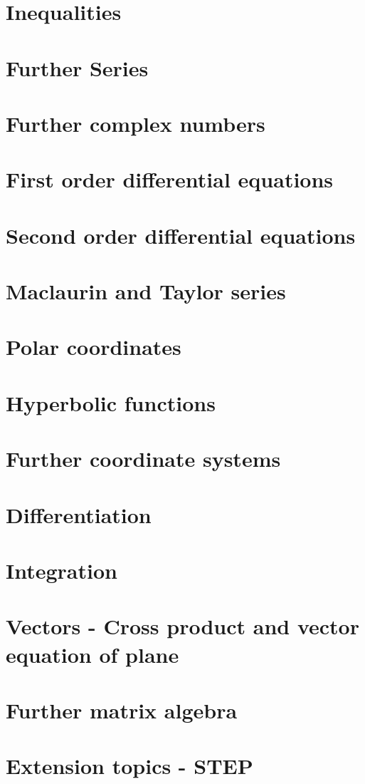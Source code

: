 \documentclass[a4paper]{article}
\begin{document}
\section{Inequalities}

\section{Further Series}

\section{Further complex numbers}

\section{First order differential equations}

\section{Second order differential equations}

\section{Maclaurin and Taylor series}

\section{Polar coordinates}

\section{Hyperbolic functions}

\section{Further coordinate systems}

\section{Differentiation}

\section{Integration}

\section{Vectors - Cross product and vector equation of plane}

\section{Further matrix algebra}

\section{Extension topics - STEP}
\end{document}
